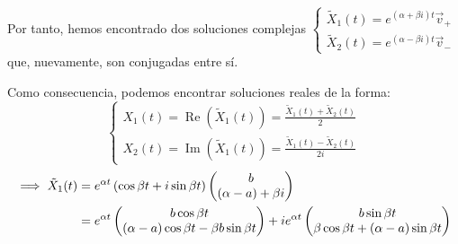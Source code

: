 \begin{itemize}
	      Por tanto, hemos encontrado dos soluciones complejas $\begin{cases}
			      \tilde{X}_1(t) = e^{(\alpha + \beta i)t} \vec{v}_+ \\
			      \tilde{X}_2(t) = e^{(\alpha - \beta i)t} \vec{v}_-
		      \end{cases}$ \\ que, nuevamente, son conjugadas entre sí.

	      Como consecuencia, podemos encontrar soluciones reales de la forma:
	      \[\begin{cases}
			      X_1(t) = \operatorname{Re}\left(\tilde{X}_1(t)\right) = \frac{\tilde{X}_1(t) + \tilde{X}_2(t)}{2} \\
			      X_2(t) = \operatorname{Im}\left(\tilde{X}_1(t)\right) = \frac{\tilde{X}_1(t) - \tilde{X}_2(t)}{2i}
		      \end{cases}\]
	      \[\begin{aligned}%
			      \implies \til{X}_1(t) & = e^{\alpha t} \left(\cos{\beta t} + i \sin{\beta t}\right) \begin{pmatrix}
				                                                                                          b \\
				                                                                                          (\alpha-a) + \beta i
			                                                                                          \end{pmatrix}             \\
			                            & = e^{\alpha t} \begin{pmatrix}
				                                             b\cos{\beta t} \\
				                                             (\alpha-a)\cos{\beta t} - \beta b \sin{\beta t}
			                                             \end{pmatrix} + i e^{\alpha t} \begin{pmatrix}
				                                                                            b\sin{\beta t} \\
				                                                                            \beta \cos {\beta t} + (\alpha-a)\sin{\beta t}
			                                                                            \end{pmatrix}
		      \end{aligned}\]



\end{itemize}


